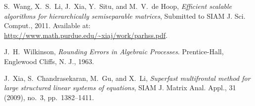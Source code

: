 \begin{thebibliography}{10}
{\sc S.~Wang, X.~S.~Li, J.~Xia, Y.~Situ, and M.~V.~de Hoop},
{\em Efficient scalable algorithms for hierarchically semiseparable matrices},
Submitted to SIAM J. Sci. Comput., 2011. 
Available at: \url{http://www.math.purdue.edu/~xiaj/work/parhss.pdf}.

{\sc J.~H.~Wilkinson},
{\em Rounding Errors in Algebraic Processes}. 
Prentice-Hall, Englewood Cliffs, N. J., 1963.

{\sc J.~Xia, S.~Chandrasekaran, M.~Gu, and X.~Li}, 
{\em Superfast multifrontal method for large structured linear systems of
 equations}, 
SIAM J. Matrix Anal. Appl., 31 (2009), no.~3, pp.~1382--1411.

\end{thebibliography} 


